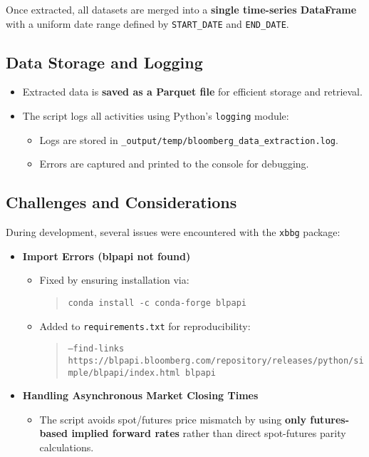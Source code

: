 \documentclass{article}
\begin{document}
Once extracted, all datasets are merged into a \textbf{single time-series DataFrame} with a uniform date range defined by \texttt{START\_DATE} and \texttt{END\_DATE}.

\subsection{Data Storage and Logging}
\begin{itemize}
  \item Extracted data is \textbf{saved as a Parquet file} for efficient storage and retrieval.
  \item The script logs all activities using Python's \texttt{logging} module:
  \begin{itemize}
    \item Logs are stored in \texttt{\_output/temp/bloomberg\_data\_extraction.log}.
    \item Errors are captured and printed to the console for debugging.
  \end{itemize}
\end{itemize}

\subsection{Challenges and Considerations}
During development, several issues were encountered with the \texttt{xbbg} package:
\begin{itemize}
  \item \textbf{Import Errors (blpapi not found)}
  \begin{itemize}
    \item Fixed by ensuring installation via:
    \begin{quote}
      \texttt{conda install -c conda-forge blpapi}
    \end{quote}
    \item Added to \texttt{requirements.txt} for reproducibility:
    \begin{quote}
      \texttt{--find-links https://blpapi.bloomberg.com/repository/releases/python/simple/blpapi/index.html
      blpapi
      }
    \end{quote}
  \end{itemize}
  \item \textbf{Handling Asynchronous Market Closing Times}
  \begin{itemize}
    \item The script avoids spot/futures price mismatch by using \textbf{only futures-based implied forward rates} rather than direct spot-futures parity calculations.
  \end{itemize}
\end{itemize}
\end{document}

